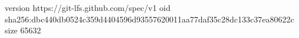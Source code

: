 version https://git-lfs.github.com/spec/v1
oid sha256:dbc440db0524c359d4404596d93557620011aa77daf35c28dc133c37ea80622c
size 65632
